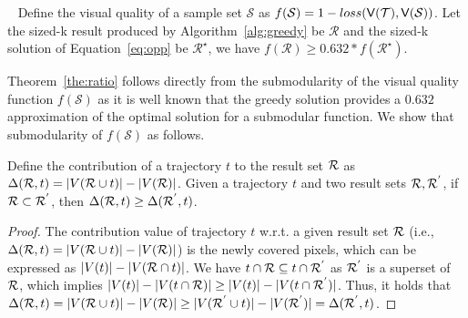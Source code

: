 \begin{theorem}~\label{the:ratio}
Define the visual quality of a sample set $\mathcal{S}$ as $f(\mathcal{S})=1-loss(\mathsf{V}(\mathcal{T}),\mathsf{V}(\mathcal{S}))$. Let the sized-k result produced by Algorithm~\ref{alg:greedy} be $\mathcal{R}$ and the sized-k solution of Equation~\eqref{eq:opp} be $\mathcal{R}^{\star}$, we have $f(\mathcal{R})\ge 0.632*f(\mathcal{R}^{\star})$.
\end{theorem}

Theorem~\ref{the:ratio} follows directly from the submodularity of the visual quality function $f(\mathcal{S})$ as it is well known that the greedy solution provides a $0.632$ approximation of the optimal solution for a submodular function. We show that submodularity of $f(\mathcal{S})$ as follows.      

\begin{lemma}[Submodularity]\label{lem:submodular}
	Define the contribution of a trajectory $t$ to the result set $\mathcal{R}$ as $\Delta(\mathcal{R}, t) = |V(\mathcal{R} \cup t)| - |V(\mathcal{R})|$.
	Given a trajectory $t$ and two result sets $\mathcal{R},\mathcal{R}^{'}$, if $\mathcal{R} \subset \mathcal{R}^{'}$, then $ \Delta(\mathcal{R}, t) \geq \Delta(\mathcal{R}^{'}, t)$.
\end{lemma}


\begin{proof}
	The contribution value of trajectory $t$ w.r.t. a given result set $\mathcal{R}$ (i.e., $\Delta(\mathcal{R}, t) = |V(\mathcal{R} \cup t)| - |V(\mathcal{R})|$) is the newly covered pixels, which can be expressed as $|V(t)| - |V(\mathcal{R} \cap t)|$.
	We have $t \cap \mathcal{R} \subseteq  t \cap \mathcal{R}^{'}$ as $\mathcal{R}^{'}$ is a superset of $\mathcal{R}$, which implies $|V(t)| - |V(t \cap \mathcal{R})| \geq |V(t)| - |V(t \cap \mathcal{R}^{'})|$.
	Thus, it holds that $\Delta(\mathcal{R}, t) = |V(\mathcal{R} \cup t)| - |V(\mathcal{R})| \geq |V(\mathcal{R}^{'} \cup t)| - |V(\mathcal{R}^{'})|= \Delta(\mathcal{R}^{'}, t)$.
\end{proof}


